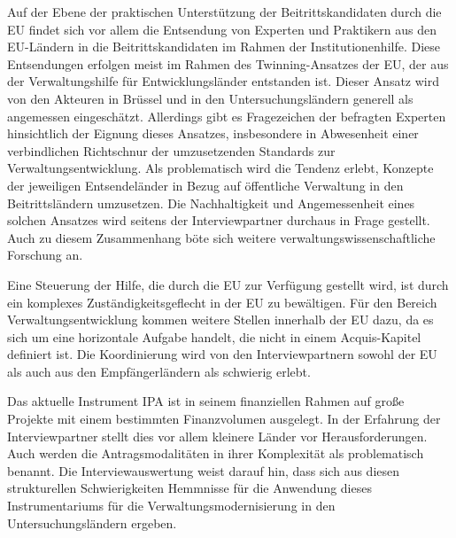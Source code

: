 Auf der Ebene der praktischen Unterstützung der Beitrittskandidaten durch die EU findet sich vor allem die Entsendung von Experten und Praktikern aus den EU-Ländern in die Beitrittskandidaten im Rahmen der Institutionenhilfe. Diese Entsendungen erfolgen meist im Rahmen des Twinning-Ansatzes der EU, der aus der Verwaltungshilfe für Entwicklungsländer entstanden ist. Dieser Ansatz wird von den Akteuren in Brüssel und in den Untersuchungsländern generell als angemessen eingeschätzt. Allerdings gibt es Fragezeichen der befragten Experten hinsichtlich der Eignung dieses Ansatzes, insbesondere in Abwesenheit einer verbindlichen Richtschnur der umzusetzenden Standards zur Verwaltungsentwicklung. Als problematisch wird die Tendenz erlebt, Konzepte der jeweiligen Entsendeländer in Bezug auf öffentliche Verwaltung in den Beitrittsländern umzusetzen. Die Nachhaltigkeit und Angemessenheit eines solchen Ansatzes wird seitens der Interviewpartner durchaus in Frage gestellt. Auch zu diesem Zusammenhang böte sich weitere verwaltungswissenschaftliche Forschung an. \par
Eine Steuerung der Hilfe, die durch die EU zur Verfügung gestellt wird, ist durch ein komplexes Zuständigkeitsgeflecht in der EU zu bewältigen. Für den Bereich Verwaltungsentwicklung kommen weitere Stellen innerhalb der EU dazu, da es sich um eine horizontale Aufgabe handelt, die nicht in einem Acquis-Kapitel definiert ist. Die Koordinierung wird von den Interviewpartnern sowohl der EU als auch aus den Empfängerländern als schwierig erlebt. \par
Das aktuelle Instrument IPA ist in seinem finanziellen Rahmen auf große Projekte mit einem bestimmten Finanzvolumen ausgelegt. In der Erfahrung der Interviewpartner stellt dies vor allem kleinere Länder vor Herausforderungen. Auch werden die Antragsmodalitäten in ihrer Komplexität als problematisch benannt. Die Interviewauswertung weist darauf hin, dass sich aus diesen strukturellen Schwierigkeiten Hemmnisse für die Anwendung dieses Instrumentariums für die Verwaltungsmodernisierung in den Untersuchungsländern ergeben. \par
